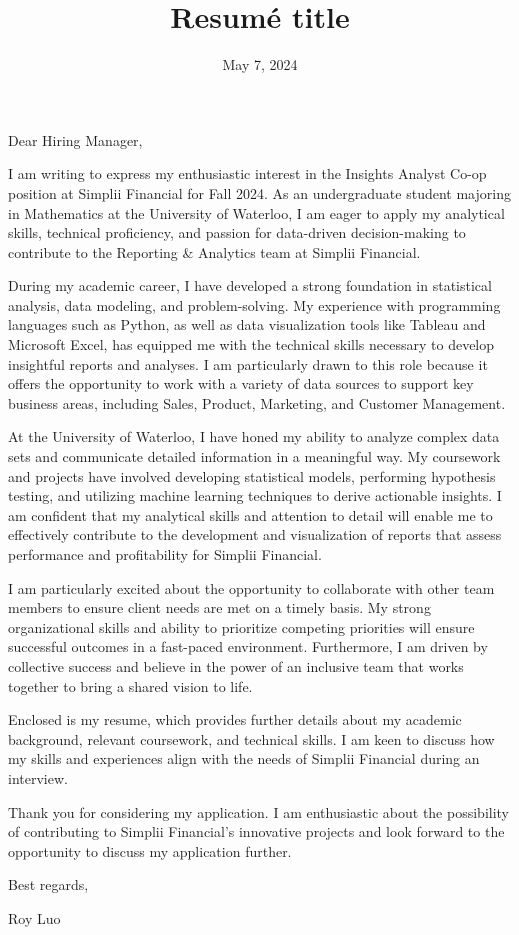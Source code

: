 \documentclass[11pt,a4paper,roman]{moderncv}        %
\title{Resumé title}                               %
\date{May 7, 2024}                              %
\begin{document}
\recipient{\phantom{1}}{}
\opening{\phantom{1}}
\closing{\phantom{1}}
\enclosure[\phantom{1}]{\phantom{1}}          %
\makelettertitle

Dear Hiring Manager,

I am writing to express my enthusiastic interest in the Insights Analyst Co-op position at Simplii Financial for Fall 2024. As an undergraduate student majoring in Mathematics at the University of Waterloo, I am eager to apply my analytical skills, technical proficiency, and passion for data-driven decision-making to contribute to the Reporting \& Analytics team at Simplii Financial.

During my academic career, I have developed a strong foundation in statistical analysis, data modeling, and problem-solving. My experience with programming languages such as Python, as well as data visualization tools like Tableau and Microsoft Excel, has equipped me with the technical skills necessary to develop insightful reports and analyses. I am particularly drawn to this role because it offers the opportunity to work with a variety of data sources to support key business areas, including Sales, Product, Marketing, and Customer Management.

At the University of Waterloo, I have honed my ability to analyze complex data sets and communicate detailed information in a meaningful way. My coursework and projects have involved developing statistical models, performing hypothesis testing, and utilizing machine learning techniques to derive actionable insights. I am confident that my analytical skills and attention to detail will enable me to effectively contribute to the development and visualization of reports that assess performance and profitability for Simplii Financial.

I am particularly excited about the opportunity to collaborate with other team members to ensure client needs are met on a timely basis. My strong organizational skills and ability to prioritize competing priorities will ensure successful outcomes in a fast-paced environment. Furthermore, I am driven by collective success and believe in the power of an inclusive team that works together to bring a shared vision to life.

Enclosed is my resume, which provides further details about my academic background, relevant coursework, and technical skills. I am keen to discuss how my skills and experiences align with the needs of Simplii Financial during an interview.

Thank you for considering my application. I am enthusiastic about the possibility of contributing to Simplii Financial's innovative projects and look forward to the opportunity to discuss my application further.

Best regards,

Roy Luo

\vspace{0.5cm}
\end{document}
